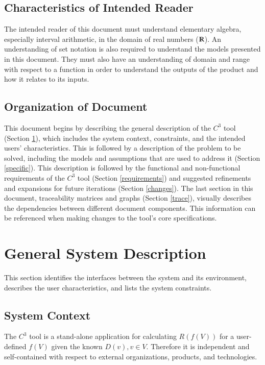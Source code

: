 \documentclass[12pt]{article}
\newcommand{\prognameAbbrv}{$C^{3}$}
\begin{document}
\subsection{Characteristics of Intended Reader}
\label{intro_reader}
The intended reader of this document must understand elementary algebra, 
especially interval arithmetic, in the domain of real numbers 
($\varmathbb{R}$). An understanding of set notation is also required to 
understand the models presented in this document. They must also have an 
understanding of domain and range with respect to a function in order to 
understand the outputs of the product 
and how it relates to its inputs.

\subsection{Organization of Document}
This document begins by describing the general description of the 
\prognameAbbrv{} tool (Section \ref{general}), which includes the system 
context, constraints, and the intended users' characteristics. This is followed 
by a description of the problem to be solved, including the models and 
assumptions that are used to address it (Section \ref{specific}). This 
description is followed by the functional and non-functional requirements of 
the \prognameAbbrv{} tool (Section \ref{requirements}) and suggested 
refinements and expansions for future iterations (Section \ref{changes}). The 
last section in this document, traceability matrices and graphs (Section 
\ref{trace}), visually describes the dependencies between different document 
components. This information can be referenced when making changes to the 
tool's core specifications.

\section{General System Description}
\label{general}

This section identifies the interfaces between the system and its environment,
describes the user characteristics, and lists the system constraints.

\subsection{System Context}
The \prognameAbbrv{} tool is a stand-alone application for calculating 
$R(f(V))$ for a user-defined $f(V)$ given the known $D(v), v\in V$. Therefore 
it is independent and self-contained with respect to external organizations, 
products, and technologies.
\end{document}
